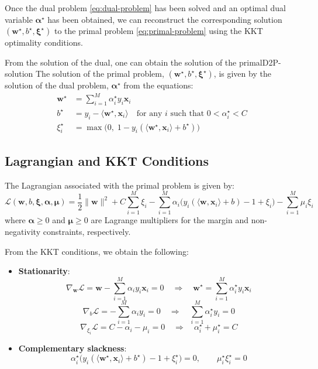 Once the dual problem \eqref{eq:dual-problem} has been solved and an optimal dual variable 
$\symbf{\alpha}^\star$ has been obtained, we can reconstruct the corresponding solution 
$(\symbf{w}^\star, b^\star, \symbf{\xi}^\star)$ to the primal problem \eqref{eq:primal-problem} 
using the KKT optimality conditions.

\begin{proposition}{From the solution of the dual, one can obtain the solution of the primal}{D2P-solution}
	The solution of the primal problem, $(\symbf{w}^\star, b^\star, \symbf{\xi}^\star)$, is given 
	by the solution of the dual problem, $\symbf{\alpha}^\star$ from the equations:
	\begin{align}
		\symbf{w}^\star &= \sum_{i=1}^M \alpha_i^\star y_i \symbf{x}_i \\
		b^\star &= y_i - \langle \symbf{w}^\star, \symbf{x}_i \rangle \quad \text{for any } i \text{ such that } 0 < \alpha_i^\star < C \\
		\xi_i^\star &= \max\big(0,\; 1 - y_i(\langle \symbf{w}^\star, \symbf{x}_i \rangle + b^\star)\big)
	\end{align}

\end{proposition}


\subsection*{Lagrangian and KKT Conditions}

The Lagrangian associated with the primal problem is given by:
\[
\mathcal{L}(\symbf{w}, b, \symbf{\xi}, \symbf{\alpha}, \symbf{\mu}) 
= \frac{1}{2} \|\symbf{w}\|^2 + C \sum_{i=1}^M \xi_i
- \sum_{i=1}^M \alpha_i \bigl( y_i (\langle \symbf{w}, \symbf{x}_i \rangle + b) - 1 + \xi_i \bigr)
- \sum_{i=1}^M \mu_i \xi_i
\]
where $\symbf{\alpha} \ge 0$ and $\symbf{\mu} \ge 0$ are Lagrange multipliers for the margin and non-negativity constraints, respectively.

From the KKT conditions, we obtain the following:

\begin{itemize}
  \item \textbf{Stationarity}:
  \[
  \nabla_{\symbf{w}} \mathcal{L} = \symbf{w} - \sum_{i=1}^M \alpha_i y_i \symbf{x}_i = 0 
  \quad \Rightarrow \quad
  \boxed{\symbf{w}^\star = \sum_{i=1}^M \alpha_i^\star y_i \symbf{x}_i}
  \]
  \[
  \nabla_b \mathcal{L} = -\sum_{i=1}^M \alpha_i y_i = 0
  \quad \Rightarrow \quad
  \boxed{\sum_{i=1}^M \alpha_i^\star y_i = 0}
  \]
  \[
  \nabla_{\xi_i} \mathcal{L} = C - \alpha_i - \mu_i = 0 
  \quad \Rightarrow \quad
  \boxed{\alpha_i^\star + \mu_i^\star = C}
  \]

  \item \textbf{Complementary slackness}:
  \[
  \alpha_i^\star \bigl( y_i(\langle \symbf{w}^\star, \symbf{x}_i \rangle + b^\star) - 1 + \xi_i^\star \bigr) = 0, 
  \qquad
  \mu_i^\star \xi_i^\star = 0
  \]
\end{itemize}

